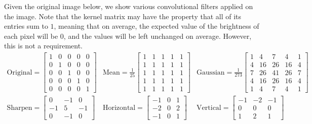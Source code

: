   \begin{example}
    \label{ex:blurs-edge-detection}
    Given the original image below, we show various convolutional filters applied on the image. Note that the kernel matrix may have the property that all of its entries sum to $1$, meaning that on average, the expected value of the brightness of each pixel will be $0$, and the values will be left unchanged on average. However, this is not a requirement.  
    \begin{align*}
      \mathrm{Original} = \begin{bmatrix} 1 & 0 & 0 & 0 & 0 \\ 0 & 1 & 0 & 0 & 0 \\ 0 & 0 & 1 & 0 & 0 \\ 0 & 0 & 0 & 1 & 0 \\ 0 & 0 & 0 & 0 & 1 \end{bmatrix} & 
      \mathrm{Mean} = \frac{1}{25} \begin{bmatrix} 1 & 1 & 1 & 1 & 1 \\ 1 & 1 & 1 & 1 & 1 \\ 1 & 1 & 1 & 1 & 1 \\ 1 & 1 & 1 & 1 & 1 \\ 1 & 1 & 1 & 1 & 1 \end{bmatrix} & 
      \mathrm{Gaussian} = \frac{1}{273} \begin{bmatrix} 1 & 4 & 7 & 4 & 1 \\ 4 & 16 & 26 & 16 & 4 \\ 7 & 26 & 41 & 26 & 7 \\ 4 & 16 & 26 & 16 & 4 \\ 1 & 4 & 7 & 4 & 1 \end{bmatrix} \\   
      \mathrm{Sharpen} = \begin{bmatrix} 0 & -1 & 0 \\ -1 & 5 & -1 \\ 0 & -1 & 0 \end{bmatrix} & 
      \mathrm{Horizontal} = \begin{bmatrix} -1 & 0 & 1 \\ -2 & 0 & 2 \\ -1 & 0 & 1 \end{bmatrix} & 
      \mathrm{Vertical} = \begin{bmatrix} -1 & -2 & -1 \\ 0 & 0 & 0 \\ 1 & 2 & 1 \end{bmatrix} 
    \end{align*}


\end{example}

